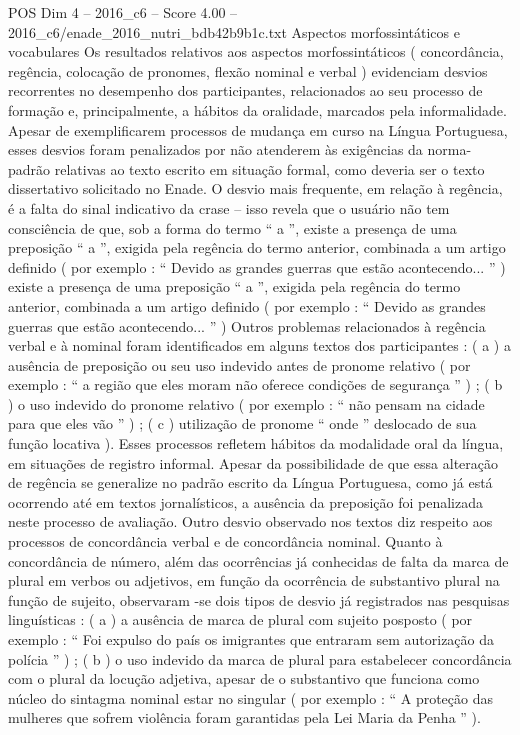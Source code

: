 \begin{textsample}{POS Dim 4 – 2016\_c6 – Score 4.00 – 2016\_c6/enade\_2016\_nutri\_bdb42b9b1c.txt}
Aspectos morfossintáticos e vocabulares Os resultados relativos aos aspectos morfossintáticos ( concordância, regência, colocação de pronomes, flexão nominal e verbal ) evidenciam desvios recorrentes no desempenho dos participantes, relacionados ao seu processo de formação e, principalmente, a hábitos da oralidade, marcados pela informalidade.
Apesar de exemplificarem processos de mudança em curso na Língua Portuguesa, esses desvios foram penalizados por não atenderem às exigências da norma-padrão relativas ao texto escrito em situação formal, como deveria ser o texto dissertativo solicitado no Enade.
O desvio mais frequente, em relação à regência, é a falta do sinal indicativo da crase – isso revela que o usuário não tem consciência de que, sob a forma do termo “ a ”, existe a presença de uma preposição “ a ”, exigida pela regência do termo anterior, combinada a um artigo definido ( por exemplo : “ Devido as grandes guerras que estão acontecendo... ” ) existe a presença de uma preposição “ a ”, exigida pela regência do termo anterior, combinada a um artigo definido ( por exemplo : “ Devido as grandes guerras que estão acontecendo... ” ) Outros problemas relacionados à regência verbal e à nominal foram identificados em alguns textos dos participantes : ( a ) a ausência de preposição ou seu uso indevido antes de pronome relativo ( por exemplo : “ a região que eles moram não oferece condições de segurança ” ) ; ( b ) o uso indevido do pronome relativo ( por exemplo : “ não pensam na cidade para que eles vão ” ) ; ( c ) utilização de pronome “ onde ” deslocado de sua função locativa ).
Esses processos refletem hábitos da modalidade oral da língua, em situações de registro informal.
Apesar da possibilidade de que essa alteração de regência se generalize no padrão escrito da Língua Portuguesa, como já está ocorrendo até em textos jornalísticos, a ausência da preposição foi penalizada neste processo de avaliação.
Outro desvio observado nos textos diz respeito aos processos de concordância verbal e de concordância nominal.
Quanto à concordância de número, além das ocorrências já conhecidas de falta da marca de plural em verbos ou adjetivos, em função da ocorrência de substantivo plural na função de sujeito, observaram -se dois tipos de desvio já registrados nas pesquisas linguísticas : ( a ) a ausência de marca de plural com sujeito posposto ( por exemplo : “ Foi expulso do país os imigrantes que entraram sem autorização da polícia ” ) ; ( b ) o uso indevido da marca de plural para estabelecer concordância com o plural da locução adjetiva, apesar de o substantivo que funciona como núcleo do sintagma nominal estar no singular ( por exemplo : “ A proteção das mulheres que sofrem violência foram garantidas pela Lei Maria da Penha ” ).

\end{textsample}
